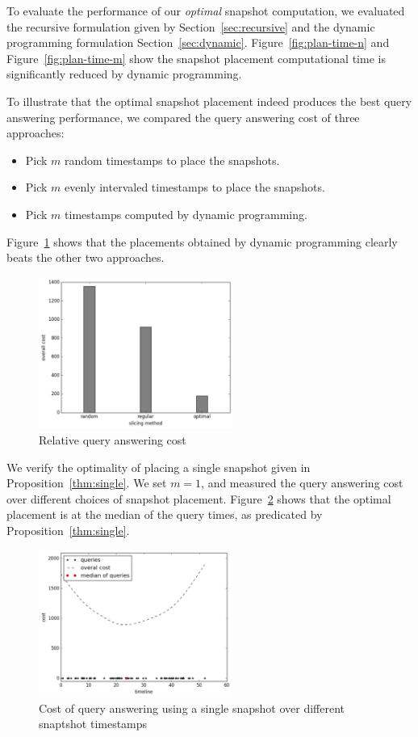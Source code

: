 To evaluate the performance of our {\em optimal} snapshot computation, we
evaluated the recursive formulation given by Section~\ref{sec:recursive}
and the dynamic programming formulation Section~\ref{sec:dynamic}.
Figure~\ref{fig:plan-time-n} and Figure~\ref{fig:plan-time-m} show the
snapshot placement computational time is significantly reduced by dynamic
programming.

To illustrate that the optimal snapshot placement indeed produces the best query
answering performance, we compared the query answering cost of three approaches:
\begin{itemize}
    \item Pick $m$ random timestamps to place the snapshots.
    \item Pick $m$ evenly intervaled timestamps to place the snapshots.
    \item Pick $m$ timestamps computed by dynamic programming.
\end{itemize}
Figure~\ref{fig:comparison} shows that the placements obtained by dynamic
programming clearly beats the other two approaches.

\begin{figure}[tb]
    \centering
    \includegraphics[width=2.5in]{figs/cuts_cost.pdf}
    \caption{Relative query answering cost}
    \label{fig:comparison}
\end{figure}

We verify the optimality of placing a single snapshot given in
Proposition~\ref{thm:single}.  We set $m=1$, and measured the query answering
cost over different choices of snapshot placement.  Figure~\ref{fig:cost-single}
shows that the optimal placement is at the median of the query times, as
predicated by Proposition~\ref{thm:single}.

\begin{figure}[tb]
    \centering
    \includegraphics[width=2.5in]{figs/single.pdf}
    \caption{Cost of query answering using a single snapshot over different
    snaptshot timestamps}
    \label{fig:cost-single}
\end{figure}

